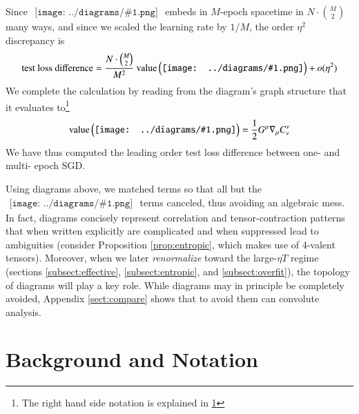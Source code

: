 \documentclass{article}
\newcommand{\dvalue}{\text{\textnormal{value}}}
\newcommand{\wrap}[1]{\left(#1\right)}
\newcommand{\sdia}[1]{\begin{gathered}\texttt{[image: ../diagrams/\#1.png]}\end{gathered}}
\begin{document}
        Since $\sdia{c(01-2)(01-12)}$ embeds in $M$-epoch spacetime in
        $N\cdot{M\choose 2}$ many ways, and since we scaled the learning rate
        by $1/M$, the order $\eta^2$ discrepancy is
        $$
            \text{test loss difference} =  
            \frac{N\cdot {M\choose 2}}{M^2}~
            \dvalue\wrap{\sdia{c(01-2)(01-12)}}
            + o(\eta^2)
        $$
        We complete the calculation by reading from the diagram's graph
        structure that it evaluates to\footnote{
            The right hand side notation is explained in \ref{sect:background}
        }
        \begin{align*}
            \dvalue\wrap{\sdia{c(01-2)(01-12)}}
            = 
            \frac{1}{2} G^\mu \nabla_\mu C^{\nu}_{\nu} 
        \end{align*}
        We have thus computed the leading order test loss difference between 
        one- and multi- epoch SGD.

        Using diagrams above, we matched terms so that all but the
        $\sdia{c(01-2)(01-12)}$ terms canceled, thus avoiding an algebraic
        mess.  In fact, diagrams concisely represent correlation and
        tensor-contraction patterns that when written explicitly are
        complicated and when suppressed lead to ambiguities (consider
        Proposition \ref{prop:entropic}, which makes use of 4-valent tensors).
        Moreover, when we later \emph{renormalize} toward the large-$\eta T$
        regime (sections \ref{subsect:effective}, \ref{subsect:entropic}, and
        \ref{subsect:overfit}), the topology of diagrams will play a key role.
        While diagrams may in principle be completely avoided, Appendix
        \ref{sect:compare} shows that to avoid them can convolute analysis.   


\section{Background and Notation} \label{sect:background}

\end{document}
